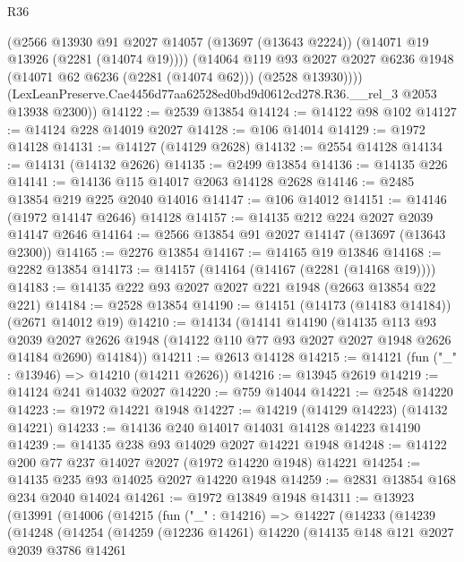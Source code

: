 \begin{lexlean}{R36}
\begin{coremodule}
          (@2566
            @13930
            @91
            @2027
            @14057
            (@13697 (@13643 @2224))
            (@14071 @19 @13926 (@2281 (@14074 @19))))
          (@14064
            @119
            @93
            @2027
            @2027
            @6236
            @1948
            (@14071 @62 @6236 (@2281 (@14074 @62)))
            (@2528 @13930))))
      (LexLeanPreserve.Cae4456d77aa62528ed0bd9d0612cd278.R36.__rel_3 @2053 @13938 @2300))
@14122 := @2539 @13854
@14124 := @14122 @98 @102
@14127 := @14124 @228 @14019 @2027
@14128 := @106 @14014
@14129 := @1972 @14128
@14131 := @14127 (@14129 @2628)
@14132 := @2554 @14128
@14134 := @14131 (@14132 @2626)
@14135 := @2499 @13854
@14136 := @14135 @226
@14141 := @14136 @115 @14017 @2063 @14128 @2628
@14146 := @2485 @13854 @219 @225 @2040 @14016
@14147 := @106 @14012
@14151 := @14146 (@1972 @14147 @2646) @14128
@14157 := @14135 @212 @224 @2027 @2039 @14147 @2646
@14164 := @2566 @13854 @91 @2027 @14147 (@13697 (@13643 @2300))
@14165 := @2276 @13854
@14167 := @14165 @19 @13846
@14168 := @2282 @13854
@14173 := @14157 (@14164 (@14167 (@2281 (@14168 @19))))
@14183 := @14135 @222 @93 @2027 @2027 @221 @1948 (@2663 @13854 @22 @221)
@14184 := @2528 @13854
@14190 := @14151 (@14173 (@14183 @14184)) (@2671 @14012 @19)
@14210 := @14134
    (@14141
      @14190
      (@14135
        @113
        @93
        @2039
        @2027
        @2626
        @1948
        (@14122 @110 @77 @93 @2027 @2027 @1948 @2626 @14184 @2690)
        @14184))
@14211 := @2613 @14128
@14215 := @14121 (fun ("_" : @13946) => @14210 (@14211 @2626))
@14216 := @13945 @2619
@14219 := @14124 @241 @14032 @2027
@14220 := @759 @14044
@14221 := @2548 @14220
@14223 := @1972 @14221 @1948
@14227 := @14219 (@14129 @14223) (@14132 @14221)
@14233 := @14136 @240 @14017 @14031 @14128 @14223 @14190
@14239 := @14135 @238 @93 @14029 @2027 @14221 @1948
@14248 := @14122 @200 @77 @237 @14027 @2027 (@1972 @14220 @1948) @14221
@14254 := @14135 @235 @93 @14025 @2027 @14220 @1948
@14259 := @2831 @13854 @168 @234 @2040 @14024
@14261 := @1972 @13849 @1948
@14311 := @13923
    (@13991
      (@14006
        (@14215
          (fun ("_" : @14216) =>
          @14227
            (@14233
              (@14239
                (@14248
                  (@14254
                    (@14259
                      (@12236 @14261)
                      @14220
                      (@14135
                        @148
                        @121
                        @2027
                        @2039
                        @3786
                        @14261

\end{coremodule}
\end{lexlean}
